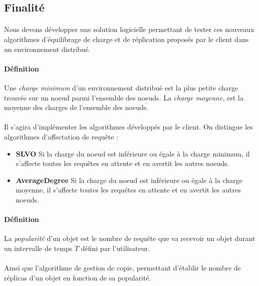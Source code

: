 \documentclass[12pt]{article}
\begin{document}

\subsection{Finalité}

\paragraph{} Nous devons développer une solution logicielle permettant de tester ces nouveaux algorithmes d'équilibrage de charge et de réplication proposés par le client dans un environnement distribué.

\paragraph{Définition} Une \textit{charge minimum} d'un environnement distribué est la plus petite charge trouvée sur un noeud parmi l'ensemble des noeuds. La \textit{charge moyenne}, est la moyenne des charges de l'ensemble des noeuds.

\paragraph{}Il s'agira d'implémenter les algorithmes développés par le client.
On distingue les algorithmes d'affectation de requête :

\begin{itemize}
 \item \textbf{SLVO} 
    Si la charge du noeud est inférieure ou égale à la charge minimum, il s'affecte toutes les requêtes en attente et en avertit les autres noeuds.
 \item \textbf{AverageDegree}
    Si la charge du noeud est inférieure ou égale à la charge moyenne, il s'affecte toutes les requêtes en attente et en avertit les autres noeuds.
\end{itemize}

\paragraph{Définition} La \textit{popularité} d'un objet est le nombre de requête que va recevoir un objet durant un intervalle de temps $T$ défini par l'utilisateur.

\paragraph{}Ainsi que l'algorithme de gestion de copie, permettant d'établir le nombre de réplicas d'un objet en fonction de sa popularité.
\end{document}
